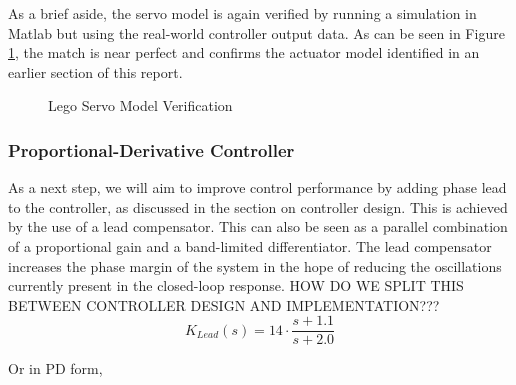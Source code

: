As a brief aside, the servo model is again verified by running a simulation in Matlab but using the real-world controller output data. As can be seen in Figure \ref{fig:LegoServoIDPart2}, the match is near perfect and confirms the actuator model identified in an earlier section of this report. \\

\begin{figure}[H]
\centering
{}
	\caption{Lego Servo Model Verification}
	\label{fig:LegoServoIDPart2}
\end{figure}

\subsubsection{Proportional-Derivative Controller}
As a next step, we will aim to improve control performance by adding phase lead to the controller, as discussed in the section on controller design. This is achieved by the use of a lead compensator.  This can also be seen as a parallel combination of a proportional gain and a band-limited differentiator. The lead compensator increases the phase margin of the system in the hope of reducing the oscillations currently present in the closed-loop response. HOW DO WE SPLIT THIS BETWEEN CONTROLLER DESIGN AND IMPLEMENTATION??? \\

\begin{equation}
K_{Lead}(s) = 14 \cdot \frac{s + 1.1}{s + 2.0}
\end{equation}

Or in PD form,

